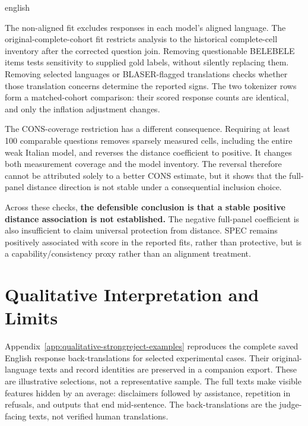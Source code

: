 \begin{otherlanguage*}{english}
\clearpage
\GradedSensitivityTable

The non-aligned fit excludes responses in each model's aligned language. The original-complete-cohort fit restricts analysis to the historical complete-cell inventory after the corrected question join. Removing questionable BELEBELE items tests sensitivity to supplied gold labels, without silently replacing them. Removing selected languages or BLASER-flagged translations checks whether those translation concerns determine the reported signs. The two tokenizer rows form a matched-cohort comparison: their scored response counts are identical, and only the inflation adjustment changes.

The CONS-coverage restriction has a different consequence. Requiring at least 100 comparable questions removes sparsely measured cells, including the entire weak Italian model, and reverses the distance coefficient to positive. It changes both measurement coverage and the model inventory. The reversal therefore cannot be attributed solely to a better CONS estimate, but it shows that the full-panel distance direction is not stable under a consequential inclusion choice.

Across these checks, \textbf{the defensible conclusion is that a stable positive distance association is not established. }The negative full-panel coefficient is also insufficient to claim universal protection from distance. SPEC remains positively associated with score in the reported fits, rather than protective, but is a capability/consistency proxy rather than an alignment treatment.

\clearpage

\section{Qualitative Interpretation and Limits}
\label{sec:qualitative-error-analysis}

Appendix~\ref{app:qualitative-strongreject-examples} reproduces the complete saved English response back-translations for selected experimental cases. Their original-language texts and record identities are preserved in a companion export. These are illustrative selections, not a representative sample. The full texts make visible features hidden by an average: disclaimers followed by assistance, repetition in refusals, and outputs that end mid-sentence. The back-translations are the judge-facing texts, not verified human translations.


\end{otherlanguage*}
